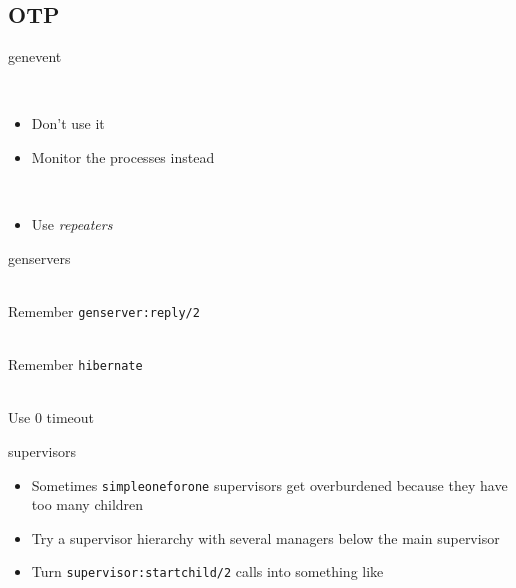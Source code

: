\documentclass[utf8]{beamer}
\begin{document}
\subsection{OTP}
\begin{frame}{gen\textunderscore event}
	\begin{description}
		\item<+->[sup\textunderscore handler]\ \\
			\begin{itemize}
				\item Don't use it
				\item Monitor the processes instead
			\end{itemize}
		\item<+->[Long Delivery Queues]\ \\
			\begin{itemize}
				\item Use \emph{repeaters}
			\end{itemize}
	\end{description}
\end{frame}
\begin{frame}{gen\textunderscore servers}
	\begin{description}
		\item<+->[Call Timeouts]\ \\
			Remember \texttt{gen\textunderscore server:reply/2}
		\item<+->[Memory Footprint]\ \\
			Remember \texttt{hibernate}
		\item<+->[Long \texttt{init/1}]\ \\
			Use $0$ timeout
	\end{description}
\end{frame}
\begin{frame}{supervisors}
	\begin{itemize}
		\item Sometimes \texttt{simple\textunderscore one\textunderscore for\textunderscore one} supervisors get \alert{overburdened} because they have too many children
		\item Try a supervisor hierarchy with several managers below the main supervisor
		\item Turn \texttt{supervisor:start\textunderscore child/2} calls into something like
		\startchild
	\end{itemize}
\end{frame}
\end{document}

